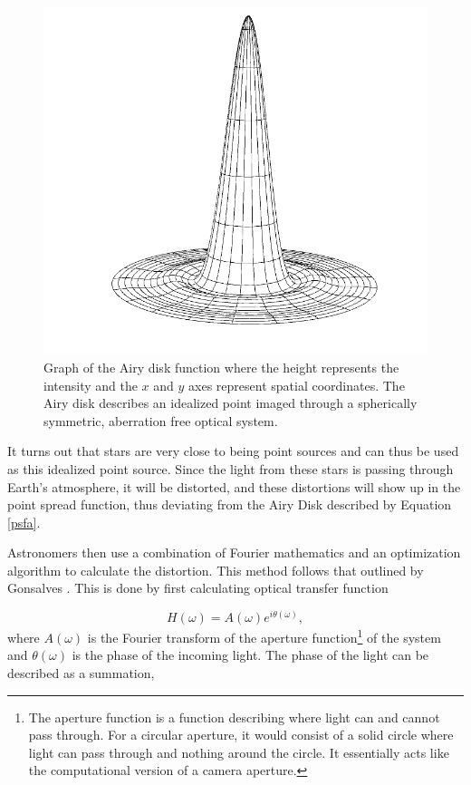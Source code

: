 \begin{figure}[h]
  \centering
  \includegraphics[scale = .4]{Images/airydisk.png}
  \caption{Graph of the Airy disk function where the height represents the intensity and the $x$ and $y$ axes represent spatial coordinates. The Airy disk describes an idealized point imaged through a spherically symmetric, aberration free optical system.}
  \label{fig:airydiska}
\end{figure}

It turns out that stars are very close to being point sources and can thus be used as this idealized point source. Since the light from these stars is passing through Earth's atmosphere, it will be distorted, and these distortions will show up in the point spread function, thus deviating from the Airy Disk described by Equation \ref{psfa}. 

Astronomers then use a combination of Fourier mathematics and an optimization algorithm to calculate the distortion. This method follows that outlined by Gonsalves \cite{Gonsalves1982}. This is done by first calculating optical transfer function

\begin{equation}
  H(\omega) = A(\omega) e^{i \theta(\omega)},
  \label{opticaltransfera}
\end{equation}
%
where $A(\omega)$ is the Fourier transform of the aperture function\footnote{The aperture function is a function describing where light can and cannot pass through. For a circular aperture, it would consist of a solid circle where light can pass through and nothing around the circle. It essentially acts like the computational version of a camera aperture.} of the system and $\theta(\omega)$ is the phase of the incoming light. The phase of the light can be described as a summation,

